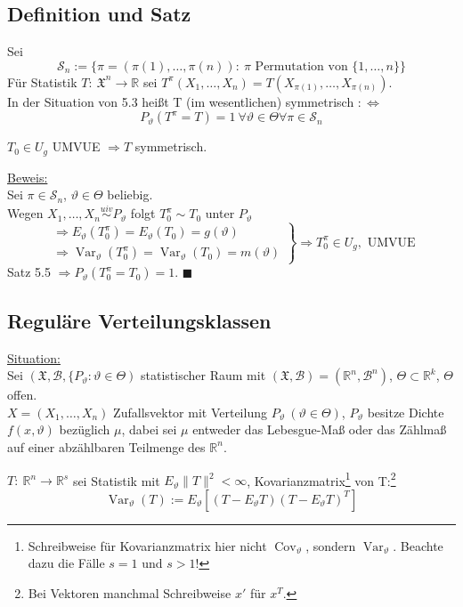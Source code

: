 \documentclass[a4paper,11pt,twoside,titlepage]{article}
\newcommand{\R}{{\mathbb R}}
\newcommand{\XX}{{\mathfrak X}} %
\newcommand\BB{ \mathcal{B} } %
\newcommand\SSS{ \mathcal{S} }
\newcommand{\uiv}{\ensuremath{\stackrel{uiv}{\sim}}}
\DeclareMathOperator{\var}{Var}
\DeclareMathOperator{\cov}{Cov}
\begin{document}
\subsection{Definition und Satz}
Sei \[\SSS_n:=\{\pi=(\pi(1),\ldots,\pi(n)):\ \pi\mbox{ Permutation von }\{1,\ldots,n\}\}\]
Für Statistik $T:\ \XX^n\to\R$ sei $T^\pi(X_1,\ldots,X_n)=T(X_{\pi(1)},\ldots,X_{\pi(n)})$.\\
In der Situation von 5.3 heißt T (im wesentlichen) symmetrisch $:\Leftrightarrow$ \[P_\vartheta(T^\pi=T)=1\ \forall\vartheta\in\Theta\forall\pi\in\SSS_n\]

$T_0\in U_g$ UMVUE $\Rightarrow T$ symmetrisch.

\underline{Beweis:}\\
Sei $\pi\in\SSS_n$, $\vartheta\in\Theta$ beliebig.\\
Wegen $X_1,\ldots,X_n\uiv P_\vartheta$ folgt $T_0^\pi\sim T_0$ unter $P_\vartheta$
\[\left.\begin{array}{l}\Rightarrow E_\vartheta(T_0^\pi)=E_\vartheta(T_0)=g(\vartheta)\\\Rightarrow\var_\vartheta(T_0^\pi)=\var_\vartheta(T_0)=m(\vartheta)\end{array}\right\}\Rightarrow T_0^\pi\in U_g,\mbox{ UMVUE}\]
Satz 5.5 $\Rightarrow P_\vartheta(T_0^\pi=T_0)=1$. $\blacksquare$

\subsection{Reguläre Verteilungsklassen}
\underline{Situation:}\\
Sei $(\XX,\BB,\{P_\vartheta:\vartheta\in\Theta)$ statistischer Raum mit $(\XX,\BB)=(\R^n,\BB^n)$, $\Theta\subset\R^k$, $\Theta$ offen.\\
$X=(X_1,\ldots,X_n)$ Zufallsvektor mit Verteilung $P_\vartheta\ (\vartheta\in\Theta)$, $P_\vartheta$ besitze Dichte $f(x,\vartheta)$ bezüglich $\mu$, dabei sei $\mu$ entweder das Lebesgue-Maß oder das Zählmaß auf einer abzählbaren Teilmenge des $\R^n$.

$T:\ \R^n\to\R^s$ sei Statistik mit $E_\vartheta\|T\|^2<\infty$, Kovarianzmatrix\footnote{Schreibweise für Kovarianzmatrix hier nicht $\cov_\vartheta$, sondern $\var_\vartheta$. Beachte dazu die Fälle $s=1$ und $s>1$!} von T:\footnote{Bei Vektoren manchmal Schreibweise $x'$ für $x^T$.}
\[\var_\vartheta(T):=E_\vartheta[(T-E_\vartheta T)(T-E_\vartheta T)^T]\]
\end{document}
